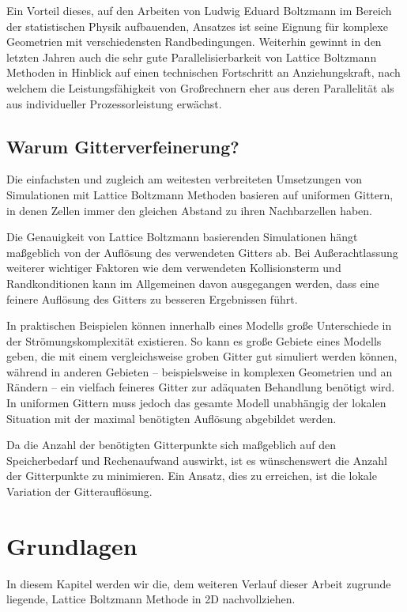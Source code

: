 \bigskip
Ein Vorteil dieses, auf den Arbeiten von Ludwig Eduard Boltzmann im Bereich der statistischen Physik aufbauenden, Ansatzes ist seine Eignung für komplexe Geometrien mit verschiedensten Randbedingungen. Weiterhin gewinnt in den letzten Jahren auch die sehr gute Parallelisierbarkeit von Lattice Boltzmann Methoden in Hinblick auf einen technischen Fortschritt an Anziehungskraft, nach welchem die Leistungsfähigkeit von Großrechnern eher aus deren Parallelität als aus individueller Prozessorleistung erwächst.

\subsection{Warum Gitterverfeinerung?}

Die einfachsten und zugleich am weitesten verbreiteten Umsetzungen von Simulationen mit Lattice Boltzmann Methoden basieren auf uniformen Gittern, in denen Zellen immer den gleichen Abstand zu ihren Nachbarzellen haben.

Die Genauigkeit von Lattice Boltzmann basierenden Simulationen hängt maßgeblich von der Auflösung des verwendeten Gitters ab. Bei Außerachtlassung weiterer wichtiger Faktoren wie dem verwendeten Kollisionsterm und Randkonditionen kann im Allgemeinen davon ausgegangen werden, dass eine feinere Auflösung des Gitters zu besseren Ergebnissen führt.

In praktischen Beispielen können innerhalb eines Modells große Unterschiede in der Strömungskomplexität existieren. So kann es große Gebiete eines Modells geben, die mit einem vergleichsweise groben Gitter gut simuliert werden können, während in anderen Gebieten -- beispielsweise in komplexen Geometrien und an Rändern -- ein vielfach feineres Gitter zur adäquaten Behandlung benötigt wird. In uniformen Gittern muss jedoch das gesamte Modell unabhängig der lokalen Situation mit der maximal benötigten Auflösung abgebildet werden.

Da die Anzahl der benötigten Gitterpunkte sich maßgeblich auf den Speicherbedarf und Rechenaufwand auswirkt, ist es wünschenswert die Anzahl der Gitterpunkte zu minimieren. Ein Ansatz, dies zu erreichen, ist die lokale Variation der Gitterauflösung.

\newpage
\section{Grundlagen}

In diesem Kapitel werden wir die, dem weiteren Verlauf dieser Arbeit zugrunde liegende, Lattice Boltzmann Methode in 2D nachvollziehen.

